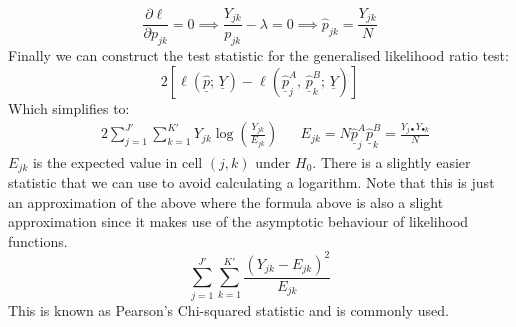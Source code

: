 \documentclass[12pt]{article}
\newcommand{\pf}[2]{\frac{\partial #1}{\partial #2}}
\begin{document}
\[\pf{\ell}{p_{jk}}=0\implies \frac{Y_{jk}}{p_{jk}}-\lambda=0\implies\hat{p}_{jk}=\frac{Y_{jk}}{N}\]
Finally we can construct the test statistic for the generalised likelihood ratio test:
\[2[\ell(\underline{\hat{p}};\, \underline{Y})-\ell(\underline{\hat{p}}_j^A,\,\underline{\hat{p}}_k^B;\, \underline{Y})]\]
Which simplifies to:
\begin{align*}
    &2\sum^{J'}_{j=1}\sum^{K'}_{k=1}Y_{jk}\log\left(\frac{Y_{jk}}{E_{jk}}\right) && E_{jk}=N\underline{\hat{p}}_j^A\underline{\hat{p}}_k^B=\frac{Y_{j\bullet}Y_{\bullet k}}{N}
\end{align*}
\(E_{jk}\) is the expected value in cell \((j,k)\) under \(H_0\). There is a slightly easier statistic that we can use to avoid calculating a logarithm. Note that this is just an approximation of the above where the formula above is also a slight approximation since it makes use of the asymptotic behaviour of likelihood functions.
\[\sum^{J'}_{j=1}\sum^{K'}_{k=1}\frac{(Y_{jk}-E_{jk})^2}{E_{jk}}\]
This is known as Pearson's Chi-squared statistic and is commonly used.
\end{document}

